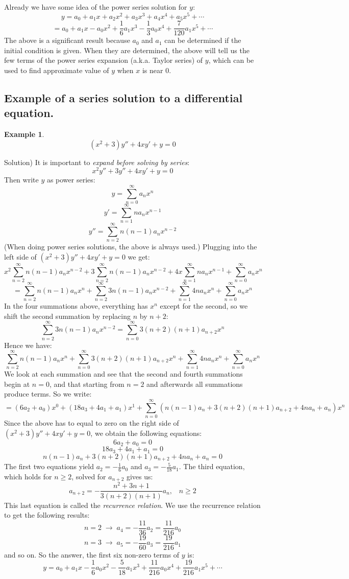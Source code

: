 \documentclass[12pt]{report}
\newtheorem{ex}{Example}[section]
\begin{document}
Already we have some idea of the power series solution for $y$:
$$y= a_0 + a_1 x + a_2 x^2 +a_3 x^3 +a_4 x^4+a_5 x^5 +\cdots$$
$$=a_0 + a_1 x - a_0 x^2 + \frac{1}{6} a_1 x^3 - \frac{1}{3} a_0 x^4+\frac{7}{120} a_1 x^5 +\cdots$$
The above is a significant result because $a_0$ and $a_1$ can be determined if the initial condition is given. When they are determined, the above will tell us the few terms of the power series expansion (a.k.a. Taylor series) of $y$, which can be used to find approximate value of $y$ when $x$ is near $0$.

\subsection*{Example of a series solution to a differential equation. }

\begin{ex}
$$(x^2+3)y'' +4xy'+y =0$$
\end{ex}
Solution)
It is important to \textit{expand before solving by series}:
$$x^2 y'' + 3y'' + 4xy'+y=0$$
Then write $y$ as power series:
$$y = \sum_{n=0}^{\infty} a_n x^{n} $$
$$y' = \sum_{n=1}^{\infty} n a_n x^{n-1} $$
$$y'' = \sum_{n=2}^{\infty} n (n-1) a_n x^{n-2} $$
(When doing power series solutions, the above is always used.)
Plugging into the left side of $(x^2+3)y'' +4xy'+y =0$ we get:
$$x^2 \sum_{n=2}^{\infty} n (n-1) a_n x^{n-2}+ 3 \sum_{n=2}^{\infty} n (n-1) a_n x^{n-2} + 4x\sum_{n=1}^{\infty} n a_n x^{n-1} + \sum_{n=0}^{\infty} a_n x^{n}$$
$$ = \sum_{n=2}^{\infty} n (n-1) a_n x^{n}+ \sum_{n=2}^{\infty} 3n (n-1) a_n x^{n-2} + \sum_{n=1}^{\infty} 4n a_n x^{n} + \sum_{n=0}^{\infty} a_n x^{n}$$
In the four summations above, everything has $x^n$ except for the second, so we shift the second summation by replacing $n$ by $n+2$:
$$\sum_{n=2}^{\infty} 3n (n-1) a_n x^{n-2} = \sum_{n=0}^{\infty} 3(n+2) (n+1) a_{n+2} x^{n}$$
Hence we have:
$$\sum_{n=2}^{\infty} n (n-1) a_n x^{n}+ \sum_{n=0}^{\infty} 3(n+2) (n+1) a_{n+2} x^{n} + \sum_{n=1}^{\infty} 4n a_n x^{n} + \sum_{n=0}^{\infty} a_n x^{n}$$
We look at each summation and see that the second and fourth summations begin at $n=0$, and that starting from $n=2$ and afterwards all summations produce terms. So we write:
$$ =(6a_2+a_0)x^0 + (18a_3+ 4a_1 + a_1)x^1 + \sum_{n=0}^{\infty} \left( n (n-1) a_n +3(n+2) (n+1) a_{n+2} + 4n a_n +a_n \right)x^n $$
Since the above has to equal to zero on the right side of $(x^2+3)y'' +4xy'+y =0$, we obtain the following equations:
$$6a_2+a_0=0$$
$$ 18a_3+ 4a_1 + a_1=0$$
$$ n (n-1) a_n +3(n+2) (n+1) a_{n+2} + 4n a_n +a_n =0 $$
The first two equations yield $a_2 = -\frac{1}{6} a_0 $ and $a_3 = -\frac{5}{18}a_1$. The third equation, which holds for $n \geq 2$, solved for $a_{n+2}$ gives us:
$$a_{n+2} = - \frac{n^2+ 3n +1}{3(n+2) (n+1)} a_n, \; \; \; n\geq 2$$
This last equation is called the \textit{recurrence relation}. We use the recurrence relation to get the following results:
$$n=2 \; \rightarrow \; a_4=- \frac{11}{36} a_2=  \frac{11}{216} a_0$$
$$n=3 \; \rightarrow \; a_5=- \frac{19}{60} a_3=  \frac{19}{216} a_1$$
and so on.
So the answer, the first six non-zero terms of $y$ is:
$$y= a_0 + a_1 x -\frac{1}{6} a_0 x^2 -\frac{5}{18}a_1 x^3 + \frac{11}{216} a_0x^4+\frac{19}{216} a_1 x^5 +\cdots$$
\end{document}
